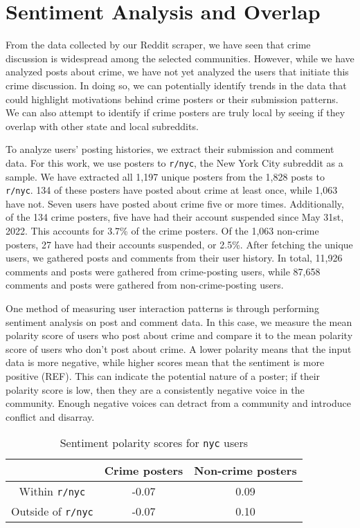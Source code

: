 \documentclass[12pt,oneside, letterpaper]{book}
\begin{document}
\section{Sentiment Analysis and Overlap}

\par From the data collected by our Reddit scraper, we have seen that crime discussion is widespread among the selected communities. However, while we have analyzed posts about crime, we have not yet analyzed the users that initiate this crime discussion. In doing so, we can potentially identify trends in the data that could highlight motivations behind crime posters or their submission patterns. We can also attempt to identify if crime posters are truly local by seeing if they overlap with other state and local subreddits. 

\par To analyze users' posting histories, we extract their submission and comment data. For this work, we use posters to \texttt{r/nyc}, the New York City subreddit as a sample. We have extracted all 1,197 unique posters from the 1,828 posts to \texttt{r/nyc}. 134 of these posters have posted about crime at least once, while 1,063 have not. Seven users have posted about crime five or more times. Additionally, of the 134 crime posters, five have had their account suspended since May 31st, 2022. This accounts for 3.7\% of the crime posters. Of the 1,063 non-crime posters, 27 have had their accounts suspended, or 2.5\%. After fetching the unique users, we gathered posts and comments from their user history. In total, 11,926 comments and posts were gathered from crime-posting users, while 87,658 comments and posts were gathered from non-crime-posting users.

\par One method of measuring user interaction patterns is through performing sentiment analysis on post and comment data. In this case, we measure the mean polarity score of users who post about crime and compare it to the mean polarity score of users who don't post about crime. A lower polarity means that the input data is more negative, while higher scores mean that the sentiment is more positive (REF). This can indicate the potential nature of a poster; if their polarity score is low, then they are a consistently negative voice in the community. Enough negative voices can detract from a community and introduce conflict and disarray.

\begin{table}[h!]
    \centering
    \small
    \caption{Sentiment polarity scores for \texttt{nyc} users}
    \begin{tabular}{| c | c | c |}
    \hline
     & Crime posters & Non-crime posters \\ \hline
    Within \texttt{r/nyc} &  -0.07 & 0.09 \\ \hline
    Outside of \texttt{r/nyc} & -0.07 & 0.10 \\ \hline
	\end{tabular}
	\label{table:table-6}
\end{table}
\end{document}
